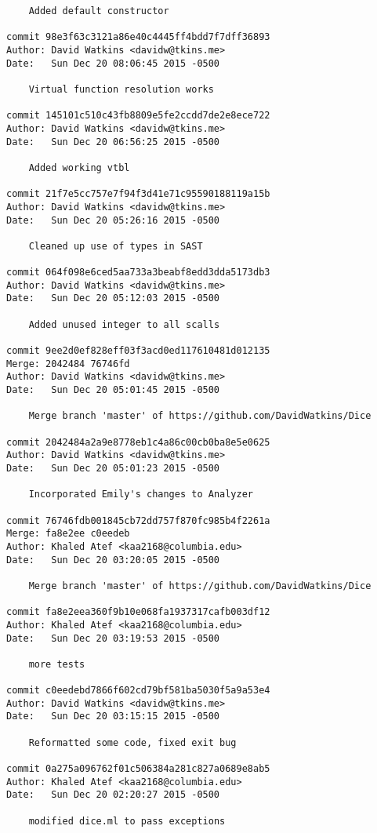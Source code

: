 \begin{verbatim}
    Added default constructor

commit 98e3f63c3121a86e40c4445ff4bdd7f7dff36893
Author: David Watkins <davidw@tkins.me>
Date:   Sun Dec 20 08:06:45 2015 -0500

    Virtual function resolution works

commit 145101c510c43fb8809e5fe2ccdd7de2e8ece722
Author: David Watkins <davidw@tkins.me>
Date:   Sun Dec 20 06:56:25 2015 -0500

    Added working vtbl

commit 21f7e5cc757e7f94f3d41e71c95590188119a15b
Author: David Watkins <davidw@tkins.me>
Date:   Sun Dec 20 05:26:16 2015 -0500

    Cleaned up use of types in SAST

commit 064f098e6ced5aa733a3beabf8edd3dda5173db3
Author: David Watkins <davidw@tkins.me>
Date:   Sun Dec 20 05:12:03 2015 -0500

    Added unused integer to all scalls

commit 9ee2d0ef828eff03f3acd0ed117610481d012135
Merge: 2042484 76746fd
Author: David Watkins <davidw@tkins.me>
Date:   Sun Dec 20 05:01:45 2015 -0500

    Merge branch 'master' of https://github.com/DavidWatkins/Dice

commit 2042484a2a9e8778eb1c4a86c00cb0ba8e5e0625
Author: David Watkins <davidw@tkins.me>
Date:   Sun Dec 20 05:01:23 2015 -0500

    Incorporated Emily's changes to Analyzer

commit 76746fdb001845cb72dd757f870fc985b4f2261a
Merge: fa8e2ee c0eedeb
Author: Khaled Atef <kaa2168@columbia.edu>
Date:   Sun Dec 20 03:20:05 2015 -0500

    Merge branch 'master' of https://github.com/DavidWatkins/Dice

commit fa8e2eea360f9b10e068fa1937317cafb003df12
Author: Khaled Atef <kaa2168@columbia.edu>
Date:   Sun Dec 20 03:19:53 2015 -0500

    more tests

commit c0eedebd7866f602cd79bf581ba5030f5a9a53e4
Author: David Watkins <davidw@tkins.me>
Date:   Sun Dec 20 03:15:15 2015 -0500

    Reformatted some code, fixed exit bug

commit 0a275a096762f01c506384a281c827a0689e8ab5
Author: Khaled Atef <kaa2168@columbia.edu>
Date:   Sun Dec 20 02:20:27 2015 -0500

    modified dice.ml to pass exceptions


\end{verbatim}
